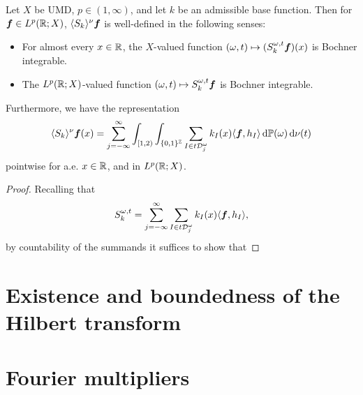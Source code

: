 \begin{lem}
  Let $X$ be UMD, $p \in (1,\infty)$, and let $k$ be an admissible base function.
  Then for $\bm{f} \in L^p(\mathbb{R};X)$, $\langle S_{k} \rangle^{\nu} \bm{f}$ is well-defined in the following senses:
  \begin{itemize}
  \item
    For almost every $x \in \mathbb{R}$, the $X$-valued function $(\omega, t) \mapsto (S_{k}^{\omega, t}\bm{f})(x)$ is Bochner integrable.
  \item
    The $L^p(\mathbb{R};X)$-valued function $(\omega,t) \mapsto S_{k}^{\omega,t}\bm{f}$ is Bochner integrable.
  \end{itemize}
  Furthermore, we have the representation
  \begin{equation*}
    \langle S_{k} \rangle^{\nu} \bm{f}(x) = \sum_{j = -\infty}^{\infty} \int_{[1,2)} \int_{\{0,1\}^{\mathbb{Z}}} \sum_{I \in t\mathcal{D}^{\omega}_{j}} k_{I}(x) \langle \bm{f}, h_{I} \rangle \, \mathrm{d}\mathbb{P}(\omega) \, \mathrm{d}\nu(t)
  \end{equation*}
  pointwise for a.e. $x \in \mathbb{R}$, and in $L^p(\mathbb{R};X)$.
\end{lem}

\begin{proof}
  Recalling that
  \begin{equation*}
    S_{k}^{\omega,t} = \sum_{j = -\infty}^{\infty} \sum_{I \in t\mathcal{D}_{j}^{\omega}} k_{I}(x) \langle \bm{f}, h_{I} \rangle,
  \end{equation*}
  by countability of the summands it suffices to show that 
\end{proof}

\begin{lem}
\end{lem}


\begin{prop}
\end{prop}

\section{Existence and boundedness of the Hilbert transform}

\section{Fourier multipliers}

